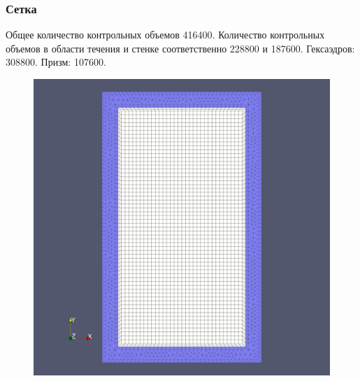 \documentclass[10pt,xcolor={dvipsnames,table},aspectratio=169]{beamer}
\begin{document}
    \begin{frame}{}

        \justifying
        \normalsize

        \frametitle{Сетка}
        
        Общее количество контрольных объемов 416400. Количество контрольных объемов в области течения и стенке соответственно 228800 и 187600. Гексаэдров: 308800. Призм: 107600.

        \begin{minipage}{0.45\linewidth}
            \begin{figure}
                \centering
                \includegraphics[scale=0.08]{mesh1}
            \end{figure}
        \end{minipage}
        \hfill
        \begin{minipage}{0.45\linewidth}
            \begin{figure}
                \centering

\end{figure}
\end{minipage}
\end{frame}
\end{document}
